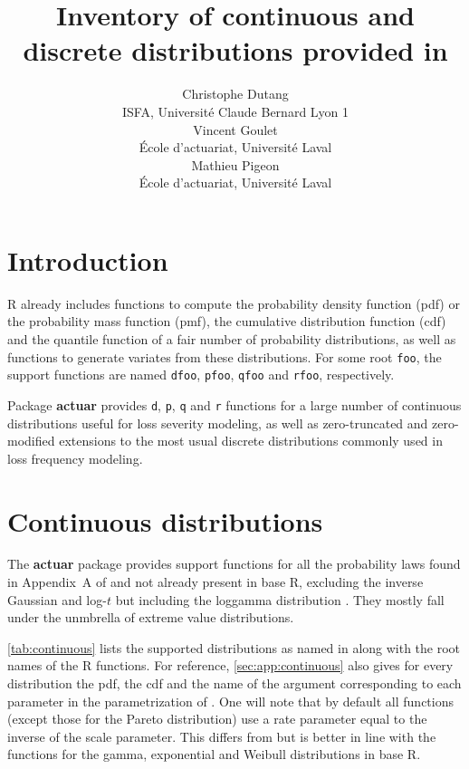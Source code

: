 \documentclass[x11names]{article}
\title{Inventory of continuous and discrete distributions provided
    in \pkg{actuar}}
\author{Christophe Dutang \\ ISFA, Université Claude Bernard Lyon 1 \\[3ex]
    Vincent Goulet \\ École d'actuariat, Université Laval \\[3ex]
    Mathieu Pigeon \\ École d'actuariat, Université Laval}
\date{}
\newcommand{\proglang}[1]{\textsf{#1}}
\newcommand{\pkg}[1]{\textbf{#1}}
\newcommand{\code}[1]{\texttt{#1}}
\begin{document}
\maketitle

\section{Introduction}
\label{sec:introduction}

\proglang{R} already includes functions to compute the probability
density function (pdf) or the probability mass function (pmf), the
cumulative distribution function (cdf) and the quantile function of a
fair number of probability distributions, as well as functions to
generate variates from these distributions. For some root \code{foo},
the support functions are named \code{dfoo}, \code{pfoo}, \code{qfoo}
and \code{rfoo}, respectively.

Package \pkg{actuar} provides \code{d}, \code{p}, \code{q} and
\code{r} functions for a large number of continuous distributions
useful for loss severity modeling, as well as zero-truncated and
zero-modified extensions to the most usual discrete distributions
commonly used in loss frequency modeling.


\section{Continuous distributions}
\label{sec:continuous}

The \pkg{actuar} package provides support functions for all the
probability laws found in Appendix~A of \cite{LossModels4e} and not
already present in base \proglang{R}, excluding the inverse Gaussian
and log-$t$ but including the loggamma distribution
\citep{HoggKlugman}. They mostly fall under the unmbrella of extreme
value distributions.

\autoref{tab:continuous} lists the supported distributions as
named in \cite{LossModels4e} along with the root names of the
\proglang{R} functions. For reference, \autoref{sec:app:continuous}
also gives for every distribution the pdf, the cdf and the name of the
argument corresponding to each parameter in the parametrization of
\cite{LossModels4e}. One will note that by default all functions
(except those for the Pareto distribution) use a rate parameter equal
to the inverse of the scale parameter. This differs from
\cite{LossModels4e} but is better in line with the functions for the
gamma, exponential and Weibull distributions in base \proglang{R}.
\end{document}
